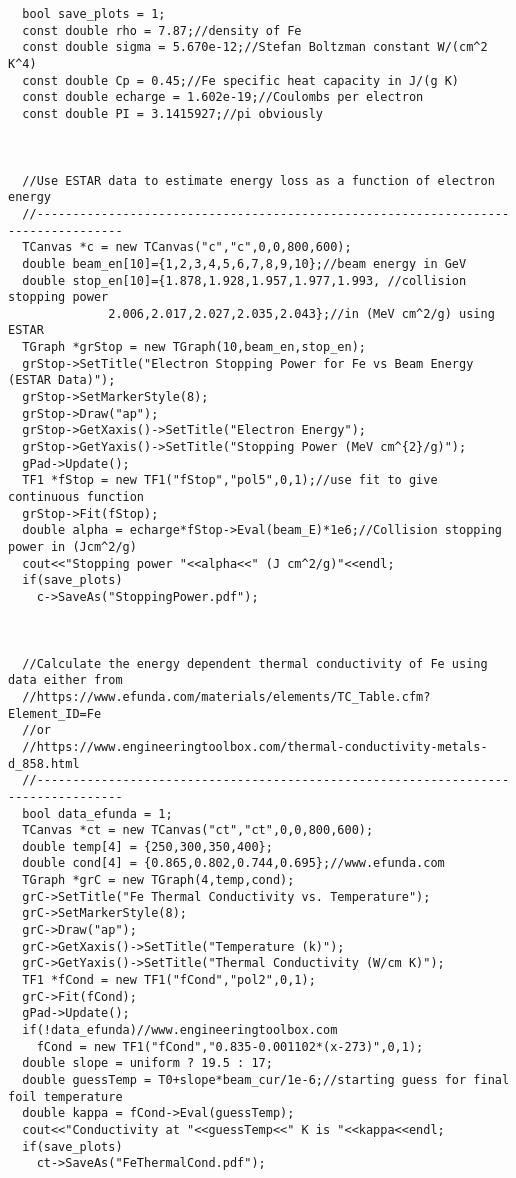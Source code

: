 \documentclass[12pt]{article}
\begin{document}
\begin{lstlisting}
  bool save_plots = 1;
  const double rho = 7.87;//density of Fe
  const double sigma = 5.670e-12;//Stefan Boltzman constant W/(cm^2 K^4)
  const double Cp = 0.45;//Fe specific heat capacity in J/(g K)
  const double echarge = 1.602e-19;//Coulombs per electron
  const double PI = 3.1415927;//pi obviously

  

  //Use ESTAR data to estimate energy loss as a function of electron energy
  //----------------------------------------------------------------------------------
  TCanvas *c = new TCanvas("c","c",0,0,800,600);
  double beam_en[10]={1,2,3,4,5,6,7,8,9,10};//beam energy in GeV
  double stop_en[10]={1.878,1.928,1.957,1.977,1.993, //collision stopping power 
		      2.006,2.017,2.027,2.035,2.043};//in (MeV cm^2/g) using ESTAR
  TGraph *grStop = new TGraph(10,beam_en,stop_en);
  grStop->SetTitle("Electron Stopping Power for Fe vs Beam Energy (ESTAR Data)");
  grStop->SetMarkerStyle(8);
  grStop->Draw("ap");
  grStop->GetXaxis()->SetTitle("Electron Energy");
  grStop->GetYaxis()->SetTitle("Stopping Power (MeV cm^{2}/g)");
  gPad->Update();
  TF1 *fStop = new TF1("fStop","pol5",0,1);//use fit to give continuous function
  grStop->Fit(fStop);  
  double alpha = echarge*fStop->Eval(beam_E)*1e6;//Collision stopping power in (Jcm^2/g)
  cout<<"Stopping power "<<alpha<<" (J cm^2/g)"<<endl;
  if(save_plots)
    c->SaveAs("StoppingPower.pdf");

  

  //Calculate the energy dependent thermal conductivity of Fe using data either from
  //https://www.efunda.com/materials/elements/TC_Table.cfm?Element_ID=Fe
  //or
  //https://www.engineeringtoolbox.com/thermal-conductivity-metals-d_858.html
  //----------------------------------------------------------------------------------
  bool data_efunda = 1;
  TCanvas *ct = new TCanvas("ct","ct",0,0,800,600);
  double temp[4] = {250,300,350,400};
  double cond[4] = {0.865,0.802,0.744,0.695};//www.efunda.com
  TGraph *grC = new TGraph(4,temp,cond);
  grC->SetTitle("Fe Thermal Conductivity vs. Temperature");
  grC->SetMarkerStyle(8);
  grC->Draw("ap");
  grC->GetXaxis()->SetTitle("Temperature (k)");
  grC->GetYaxis()->SetTitle("Thermal Conductivity (W/cm K)");
  TF1 *fCond = new TF1("fCond","pol2",0,1);
  grC->Fit(fCond);
  gPad->Update();
  if(!data_efunda)//www.engineeringtoolbox.com
    fCond = new TF1("fCond","0.835-0.001102*(x-273)",0,1);
  double slope = uniform ? 19.5 : 17;
  double guessTemp = T0+slope*beam_cur/1e-6;//starting guess for final foil temperature
  double kappa = fCond->Eval(guessTemp);
  cout<<"Conductivity at "<<guessTemp<<" K is "<<kappa<<endl;
  if(save_plots)
    ct->SaveAs("FeThermalCond.pdf");



\end{lstlisting}
\end{document}
